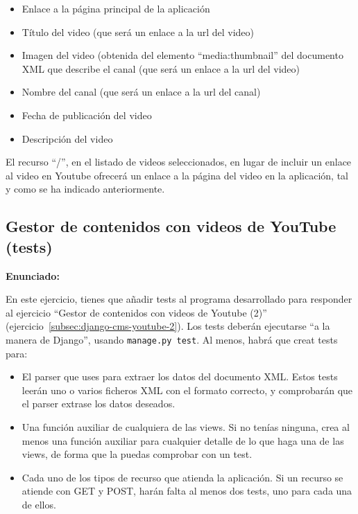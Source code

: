 \begin{itemize}
\item Enlace a la página principal de la aplicación
\item Título del video (que será un enlace a la url del video)
\item Imagen del video (obtenida del elemento ``media:thumbnail'' del documento XML que describe el canal (que será un enlace a la url del video)
\item Nombre del canal (que será un enlace a la url del canal)
\item Fecha de publicación del video
\item Descripción del video
\end{itemize}

El recurso ``/'', en el listado de videos seleccionados, en lugar de incluir un enlace al video en Youtube ofrecerá un enlace a la página del video en la aplicación, tal y como se ha indicado anteriormente.

\subsection{Gestor de contenidos con videos de YouTube (tests)}
\label{subsec:django-cms-youtube-tests}

\textbf{Enunciado:}

En este ejercicio, tienes que añadir tests al programa desarrollado para responder al ejercicio  ``Gestor de contenidos con videos de Youtube (2)'' (ejercicio~\ref{subsec:django-cms-youtube-2}). Los tests deberán ejecutarse ``a la manera de Django'', usando \verb|manage.py test|. Al menos, habrá que creat tests para:

\begin{itemize}
\item El parser que uses para extraer los datos del documento XML. Estos tests leerán uno o varios ficheros XML con el formato correcto, y comprobarán que el parser extrase los datos deseados.
\item Una función auxiliar de cualquiera de las views. Si no tenías ninguna, crea al menos una función auxiliar para cualquier detalle de lo que haga una de las views, de forma que la puedas comprobar con un test.
\item Cada uno de los tipos de recurso que atienda la aplicación. Si un recurso se atiende con GET y POST, harán falta al menos dos tests, uno para cada una de ellos.
\end{itemize}


